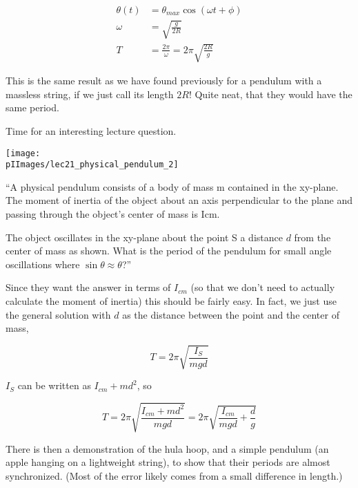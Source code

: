 \begin{align}
\theta(t) &= \theta_{max} \cos(\omega t + \phi)\\
\omega    &= \sqrt{\frac{g}{2 R}}\\
T         &= \frac{2 \pi}{\omega} = 2 \pi \sqrt{\frac{2 R}{g}}
\end{align}

This is the same result as we have found previously for a pendulum with a massless string, if we just call its length $2 R$! Quite neat, that they would have the same period.	

Time for an interesting lecture question.

\begin{center}
\texttt{[image: \\pIImages/lec21\_physical\_pendulum\_2]}
\end{center}

``A physical pendulum consists of a body of mass m contained in the xy-plane. The moment of inertia of the object about an axis perpendicular to the plane and passing through the object's center of mass is Icm.

The object oscillates in the xy-plane about the point S a distance $d$ from the center of mass as shown. What is the period of the pendulum for small angle oscillations where $\sin\theta \approx \theta$?''

Since they want the answer in terms of $I_{cm}$ (so that we don't need to actually calculate the moment of inertia) this should be fairly easy. In fact, we just use the general solution with $d$ as the distance between the point and the center of mass,

\begin{equation}
T = 2 \pi \sqrt{\frac{I_{S}}{m g d}}
\end{equation}

$I_S$ can be written as $I_{cm} + m d^2$, so

\begin{equation}
T = 2 \pi \sqrt{\frac{I_{cm} + m d^2}{m g d}} = 2 \pi \sqrt{\frac{I_{cm}}{m g d} + \frac{d}{g}}
\end{equation}

There is then a demonstration of the hula hoop, and a simple pendulum (an apple hanging on a lightweight string), to show that their periods are almost synchronized. (Most of the error likely comes from a small difference in length.)

